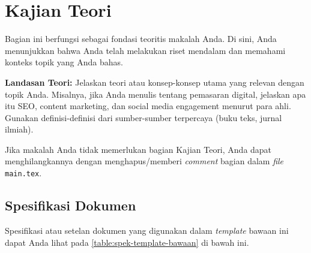 \chapter{Kajian Teori} %


Bagian ini berfungsi sebagai fondasi teoritis makalah Anda. Di sini, Anda menunjukkan bahwa Anda telah melakukan riset mendalam dan memahami konteks topik yang Anda bahas.

\textbf{Landasan Teori:} Jelaskan teori atau konsep-konsep utama yang relevan dengan topik Anda. Misalnya, jika Anda menulis tentang pemasaran digital, jelaskan apa itu SEO, content marketing, dan social media engagement menurut para ahli. Gunakan definisi-definisi dari sumber-sumber terpercaya (buku teks, jurnal ilmiah).

Jika makalah Anda tidak memerlukan bagian Kajian Teori, Anda dapat menghilangkannya dengan menghapus/memberi \textit{comment} bagian \verb|| dalam \textit{file} \texttt{main.tex}.

\section{Spesifikasi Dokumen}

Spesifikasi atau setelan dokumen yang digunakan dalam \textit{template} bawaan ini dapat Anda lihat pada \autoref{table:spek-template-bawaan} di bawah ini.

